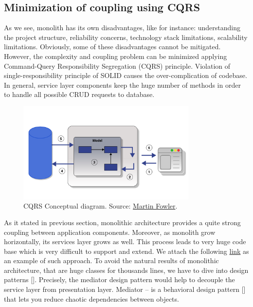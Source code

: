 \subsection{Minimization of coupling using CQRS}\label{subsec:decoupling-monolith-using-cqrs}
As we see, monolith has its own disadvantages, like for instance: understanding the project structure, reliability concerns,
technology stack limitations, scalability limitations.
Obviously, some of these disadvantages cannot be mitigated.
However, the complexity and coupling problem can be minimized applying Command-Query Responsibility Segregation (CQRS)
principle.
Violation of single-responsibility principle of SOLID causes the over-complication of codebase.
In general, service layer components keep the huge number of methods in order to handle all possible CRUD requests
to database.
\begin{figure}[H]
    \centering
    \includegraphics[width=0.8\textwidth]{Pictures/Services}
    \caption{CQRS Conceptual diagram.
    Source: \href{https://martinfowler.com/bliki/CQRS.html}{Martin Fowler}.}\label{fig:figure9}
\end{figure}
As it stated in previous section, monolithic architecture provides a quite strong coupling between application
components.
Moreover, as monolith grow horizontally, its services layer grows as well.
This process leads to very huge code base which is very difficult to support and extend.
We attach the following
\href{https://github.com/smartstore/SmartStoreNET/blob/4.x/src/Presentation/SmartStore.Web/Controllers/CatalogHelper.cs}
{link}
as an example of such approach.
To avoid the natural results of monolithic architecture, that are huge classes for thousands lines, we have to dive into
design patterns [\cite{rising1998design}].
Precisely, the mediator design pattern would help to decouple the service layer from presentation layer.
Mediator -- is a behavioral design pattern [\cite{rasche2016building}] that lets you reduce chaotic dependencies between objects.
